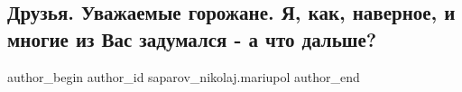  
 
 
 
 

\subsection{Друзья. Уважаемые горожане.  Я, как, наверное, и многие из Вас задумался - а что дальше?}
\label{sec:20_03_2022.fb.saparov_nikolaj.mariupol.1.druzya__uvazhaemie_g}

\ifcmt
 author_begin
   author_id saparov_nikolaj.mariupol
 author_end
\fi

